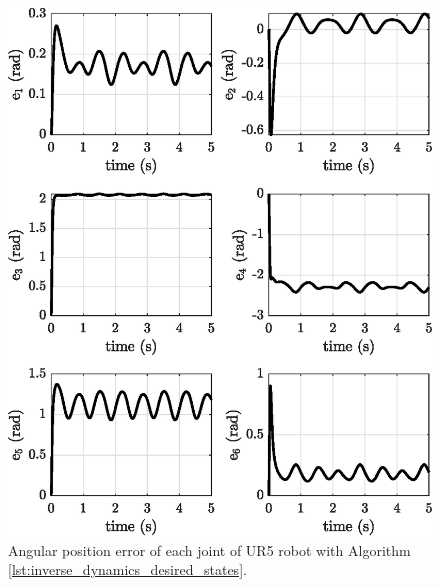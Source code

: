 	
\begin{figure}[H]
    \centering
    \includegraphics{images/act_2.7_xyz/e.eps}
    \caption{Angular position error of each joint of UR5 robot with Algorithm \ref{lst:inverse_dynamics_desired_states}.}
    \label{fig:act_2.6_e}
\end{figure}
